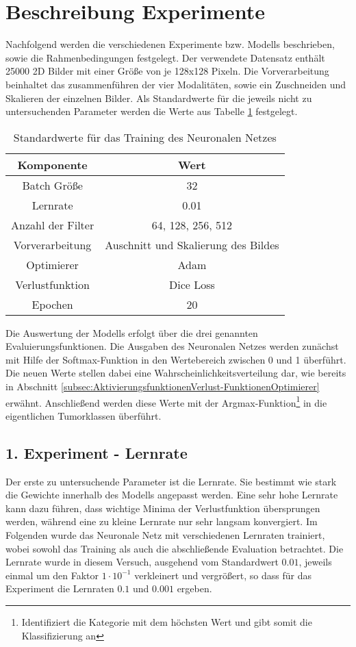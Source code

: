 \section{Beschreibung Experimente}
Nachfolgend werden die verschiedenen Experimente bzw. \glspl{Modell} beschrieben, sowie die Rahmenbedingungen festgelegt. Der verwendete Datensatz enthält 25000 2D Bilder mit einer Größe von je 128x128 Pixeln. Die Vorverarbeitung beinhaltet das zusammenführen der vier Modalitäten, sowie ein Zuschneiden und Skalieren der einzelnen Bilder. Als Standardwerte für die jeweils nicht zu untersuchenden Parameter werden die Werte aus Tabelle \ref{table:StandardWerte} festgelegt.
\begin{table}[!ht]
\begin{longtable}{|c|c|}
	\hline
		\multicolumn{1}{|c|}{\textbf{Komponente}} & \multicolumn{1}{c|}{\textbf{Wert}} \\
		\endhead
	\hline
		Batch Größe & 32 \\
	\hline
		Lernrate & 0.01 \\
	\hline
		Anzahl der Filter & 64, 128, 256, 512 \\
	\hline
		Vorverarbeitung & Auschnitt und Skalierung des Bildes \\
	\hline
		Optimierer & Adam \\
	\hline
		Verlustfunktion & Dice Loss \\
	\hline
		Epochen & 20 \\
	\hline
\end{longtable}
\caption{Standardwerte für das Training des Neuronalen Netzes}
\label{table:StandardWerte}
\end{table}

Die Auswertung der \glspl{Modell} erfolgt über die drei genannten Evaluierungsfunktionen. Die Ausgaben des Neuronalen Netzes werden zunächst mit Hilfe der Softmax-Funktion in den Wertebereich zwischen 0 und 1 überführt. Die neuen Werte stellen dabei eine Wahrscheinlichkeitsverteilung dar, wie bereits in Abschnitt \ref{subsec:AktivierungsfunktionenVerlust-FunktionenOptimierer} erwähnt. Anschließend werden diese Werte mit der Argmax-Funktion\footnote{Identifiziert die Kategorie mit dem höchsten Wert und gibt somit die Klassifizierung an} in die eigentlichen Tumorklassen überführt.

\subsection{1. Experiment - Lernrate}
Der erste zu untersuchende Parameter ist die Lernrate. Sie bestimmt wie stark die Gewichte innerhalb des \gls{Modell}s angepasst werden. Eine sehr hohe Lernrate kann dazu führen, dass wichtige Minima der Verlustfunktion übersprungen werden, während eine zu kleine Lernrate nur sehr langsam konvergiert. Im Folgenden wurde das Neuronale Netz mit verschiedenen Lernraten trainiert, wobei sowohl das Training als auch die abschließende Evaluation betrachtet. Die Lernrate wurde in diesem Versuch, ausgehend vom Standardwert $0.01$, jeweils einmal um den Faktor $1\cdot 10^{-1}$ verkleinert und vergrößert, so dass für das Experiment die Lernraten $0.1$ und $0.001$ ergeben.

